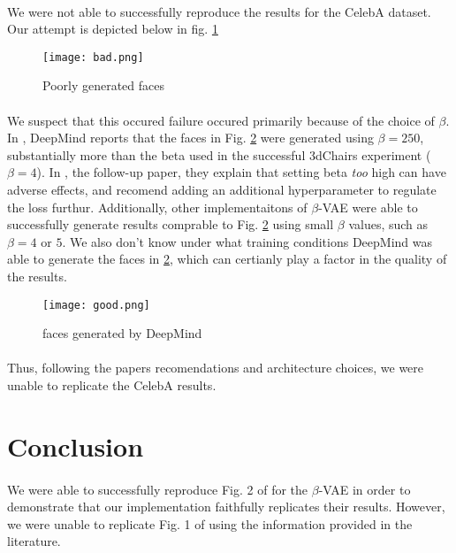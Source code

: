 \documentclass[justified,nobib]{tufte-handout}
\begin{document}
\begin{fullwidth}
\paragraph{} We were not able to successfully reproduce the results for the CelebA dataset. Our attempt is depicted below in fig. \ref{bad}
\begin{figure}
\centering
\label{bad}
\texttt{[image: bad.png]}
\caption{Poorly generated faces} 
\end{figure}
\paragraph{} We suspect that this occured failure occured primarily because of the choice of $\beta$. In \cite{bvae}, DeepMind reports that the faces in Fig. \ref{good} were generated using $\beta = 250$, substantially more than the beta used in the successful 3dChairs experiment ($\beta=4$). In \cite{bvae-dis}, the follow-up paper, they explain that setting beta \textit{too} high can have adverse effects, and recomend adding an additional hyperparameter to regulate the loss furthur. Additionally, other implementaitons of $\beta$-VAE were able to successfully generate results comprable to Fig. \ref{good} using small $\beta$ values, such as $\beta=4$ or $5$. We also don't know under what training conditions DeepMind was able to generate the faces in \ref{good}, which can certianly play a factor in the quality of the results. 
\begin{figure}
\centering
\label{good}
\texttt{[image: good.png]}
\caption{faces generated by DeepMind} 
\end{figure}
\paragraph{} Thus, following the papers recomendations and architecture choices, we were unable to replicate the CelebA results. 
\clearpage
\section{Conclusion}
\paragraph{} We were able to successfully reproduce Fig. 2 of \citep{bvae} for the $\beta$-VAE in order to demonstrate that our implementation faithfully replicates their results. However, we were unable to replicate Fig. 1 of \citep{bvae} using the information provided in the literature. 
{}


\end{fullwidth}
\end{document}
